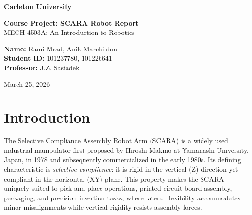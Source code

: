 \documentclass{article}
\begin{document}
\begin{titlepage}
    \centering
    
    
    
    {\Huge \textbf{Carleton University}}\\[1.5cm]
    
    \vfill %
    
    {\LARGE \textbf{Course Project: SCARA Robot Report}}\\[1.5cm]
    
    {\Large MECH 4503A: An Introduction to Robotics}\\[0.5cm]
    
    \vfill %
    
    
    \vfill
    \begin{flushleft}
    \textbf{Name:} Rami Mrad, Anik Marchildon\\
    \textbf{Student ID:} 101237780, 101226641\\
    \textbf{Professor:} J.Z. Sasiadek\\
    \end{flushleft}
    
    \vfill

    {\Large March 25, 2026}
    
\end{titlepage}







\section{Introduction}
The Selective Compliance Assembly Robot Arm (SCARA) is a widely used industrial manipulator first proposed by Hiroshi Makino at Yamanashi University, Japan, in 1978 and subsequently commercialized in the early 1980s. Its defining characteristic is \textit{selective compliance}: it is rigid in the vertical (Z) direction yet compliant in the horizontal (XY) plane. This property makes the SCARA uniquely suited to pick-and-place operations, printed circuit board assembly, packaging, and precision insertion tasks, where lateral flexibility accommodates minor misalignments while vertical rigidity resists assembly forces.
\end{document}

